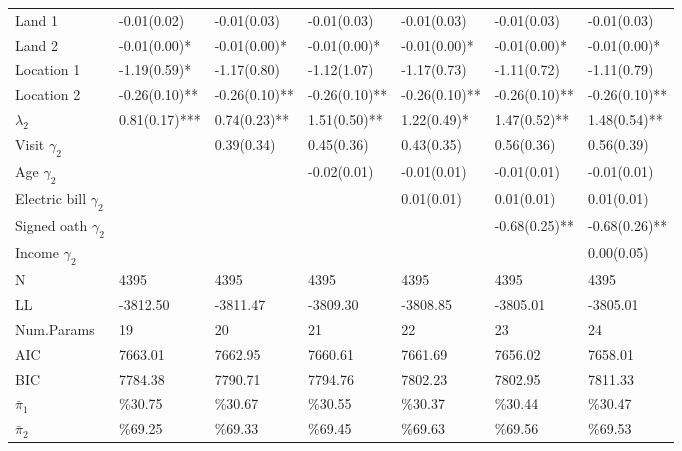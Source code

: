 \begin{tabular}{lllllll}
  Land 1 & -0.01(0.02)    & -0.01(0.03)    & -0.01(0.03)    & -0.01(0.03)    & -0.01(0.03)    & -0.01(0.03)    \\ 
  Land 2 & -0.01(0.00)*   & -0.01(0.00)*   & -0.01(0.00)*   & -0.01(0.00)*   & -0.01(0.00)*   & -0.01(0.00)*   \\ 
  Location 1 & -1.19(0.59)*   & -1.17(0.80)    & -1.12(1.07)    & -1.17(0.73)    & -1.11(0.72)    & -1.11(0.79)    \\ 
  Location 2 & -0.26(0.10)**  & -0.26(0.10)**  & -0.26(0.10)**  & -0.26(0.10)**  & -0.26(0.10)**  & -0.26(0.10)**  \\ 
  $\lambda_{2}$ &  0.81(0.17)*** &  0.74(0.23)**  &  1.51(0.50)**  &  1.22(0.49)*   &  1.47(0.52)**  &  1.48(0.54)**  \\ 
  Visit $\gamma_{2}$ &  &  0.39(0.34)    &  0.45(0.36)    &  0.43(0.35)    &  0.56(0.36)    &  0.56(0.39)    \\ 
  Age $\gamma_{2}$ &  &  & -0.02(0.01)    & -0.01(0.01)    & -0.01(0.01)    & -0.01(0.01)    \\ 
  Electric bill $\gamma_{2}$ &  &  &  &  0.01(0.01)    &  0.01(0.01)    &  0.01(0.01)    \\ 
  Signed oath $\gamma_{2}$ &  &  &  &  & -0.68(0.25)**  & -0.68(0.26)**  \\ 
  Income $\gamma_{2}$ &  &  &  &  &  &  0.00(0.05)    \\ 
  N & 4395 & 4395 & 4395 & 4395 & 4395 & 4395 \\ 
  LL & -3812.50 & -3811.47 & -3809.30 & -3808.85 & -3805.01 & -3805.01 \\ 
  Num.Params & 19 & 20 & 21 & 22 & 23 & 24 \\ 
  AIC & 7663.01 & 7662.95 & 7660.61 & 7661.69 & 7656.02 & 7658.01 \\ 
  BIC & 7784.38 & 7790.71 & 7794.76 & 7802.23 & 7802.95 & 7811.33 \\ 
  $\bar{\pi}_{1}$ & \%30.75 & \%30.67 & \%30.55 & \%30.37 & \%30.44 & \%30.47 \\ 
  $\bar{\pi}_{2}$ & \%69.25 & \%69.33 & \%69.45 & \%69.63 & \%69.56 & \%69.53 \\ 
   \hline
\end{tabular}

